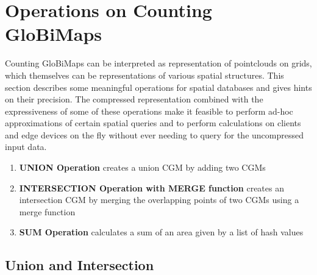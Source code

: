 \documentclass[sigconf]{acmart}
\begin{document}
%
%

\section{Operations on Counting GloBiMaps}\label{operations-on-counting-globimaps}

Counting GloBiMaps can be interpreted as representation of pointclouds on grids, which themselves can be representations of various spatial structures. This section describes some meaningful operations for spatial databases and gives hints on their precision.
The compressed representation combined with the expressiveness of some
of these operations make it feasible to perform ad-hoc approximations of
certain spatial queries and to perform calculations on clients and edge
devices on the fly without ever needing to query for the uncompressed input data.

\begin{enumerate}
  \item{\textbf{UNION Operation} creates a union CGM by adding two CGMs}
  \item{\textbf{INTERSECTION Operation with MERGE function} creates an intersection CGM by merging the overlapping points of two CGMs using a merge function}
  \item{\textbf{SUM Operation} calculates a sum of an area given by a list of hash values}
\end{enumerate}

\subsection{Union and Intersection}\label{union-and-intersection}
\end{document}
